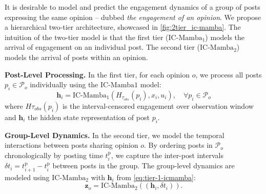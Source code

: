 It is desirable to model and predict the engagement dynamics of a group of posts expressing the same opinion -- dubbed \emph{the engagement of an opinion}.
We propose a hierarchical two-tier architecture, showcased in \cref{fig:2tier_ic-mamba}.
The intuition of the two-tier \icmamba model is that the first tier ($\text{IC-Mamba}_{1}$) models the arrival of engagement on an individual post. 
The second tier ($\text{IC-Mamba}_2$) models the arrival of posts within an opinion.

\noindent\textbf{Post-Level Processing.}
In the first tier, for each opinion $o$, we process all posts $p_i \in \mathcal{P}_o$ individually using the $\text{IC-Mamba}{1}$ model:
\begin{equation}
\label{eq:tier-1-icmamba}
        \mathbf{h}_i = \text{IC-Mamba}_{1}(H_{\tau_{obs}}(p_i), x_i, u_i), \quad \forall p_i \in \mathcal{P}_o
\end{equation}
where $H{\tau_{obs}}(p_i)$ is the interval-censored engagement over observation window and $\mathbf{h}_i$ the hidden state representation of post $p_i$.

\noindent\textbf{Group-Level Dynamics.}
In the second tier, we model the temporal interactions between posts sharing opinion $o$. 
By ordering posts in $\mathcal{P}_o$ chronologically by posting time $t_i^{\mathrm{p}}$, we capture the inter-post intervals $\delta t_i = t_{i+1}^{\mathrm{p}} - t_i^{\mathrm{p}}$ between posts in the group. 
The group-level dynamics are modeled using $\text{IC-Mamba}_2$ with $\mathbf{h}_i$ from \cref{eq:tier-1-icmamba}:
\begin{equation*}
\mathbf{z}_o = \text{IC-Mamba}_2({(\mathbf{h}_i, \delta t_i)}).
\end{equation*}

